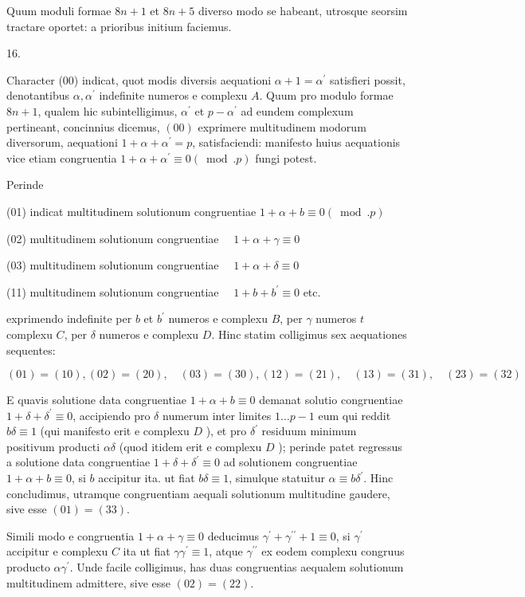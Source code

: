 \documentclass[10pt]{article}
\begin{document}
Quum moduli formae \(8 n+1\) et \(8 n+5\) diverso modo se habeant, utrosque seorsim tractare oportet: a prioribus initium faciemus.

16.

Character (00) indicat, quot modis diversis aequationi \(\alpha+1=\alpha^{\prime}\) satisfieri possit, denotantibus \(\alpha, \alpha^{\prime}\) indefinite numeros e complexu \(A\). Quum pro modulo formae \(8 n+1\), qualem hic subintelligimus, \(\alpha^{\prime}\) et \(p-\alpha^{\prime}\) ad eundem complexum pertineant, concinnius dicemus, \((00)\) exprimere multitudinem modorum diversorum, aequationi \(1+\alpha+\alpha^{\prime}=p\), satisfaciendi: manifesto huius aequationis vice etiam congruentia \(1+\alpha+\alpha^{\prime} \equiv 0(\bmod . p)\) fungi potest.

Perinde

(01) indicat multitudinem solutionum congruentiae \(1+\alpha+b \equiv 0(\bmod . p)\)

(02) multitudinem solutionum congruentiae \(\quad 1+\alpha+\gamma \equiv 0\)

(03) multitudinem solutionum congruentiae \(\quad 1+\alpha+\delta \equiv 0\)

(11) multitudinem solutionum congruentiae \(\quad 1+b+b^{\prime} \equiv 0\) etc.

exprimendo indefinite per \(b\) et \(b^{\prime}\) numeros e complexu \(B\), per \(\gamma\) numeros \(t\) complexu \(C\), per \(\delta\) numeros e complexu \(D\). Hinc statim colligimus sex aequationes sequentes:

\[
(01)=(10),(02)=(20), \quad(03)=(30),(12)=(21), \quad(13)=(31), \quad(23)=(32)
\]

E quavis solutione data congruentiae \(1+\alpha+b \equiv 0\) demanat solutio congruentiae \(1+\delta+\delta^{\prime} \equiv 0\), accipiendo pro \(\delta\) numerum inter limites \(1 \ldots p-1\)
eum qui reddit \(b \delta \equiv 1\) (qui manifesto erit e complexu \(D\) ), et pro \(\delta^{\prime}\) residuum minimum positivum producti \(\alpha \delta\) (quod itidem erit e complexu \(D\) ); perinde patet regressus a solutione data congruentiae \(1+\delta+\delta^{\prime} \equiv 0\) ad solutionem congruentiae \(1+\alpha+b \equiv 0\), si \(b\) accipitur ita. ut fiat \(b \delta \equiv 1\), simulque statuitur \(\alpha \equiv b \delta^{\prime}\). Hinc concludimus, utramque congruentiam aequali solutionum multitudine gaudere, sive esse \((01)=(33)\).

Simili modo e congruentia \(1+\alpha+\gamma \equiv 0\) deducimus \(\gamma^{\prime}+\gamma^{\prime \prime}+1 \equiv 0\), si \(\gamma^{\prime}\) accipitur e complexu \(C\) ita ut fiat \(\gamma \gamma^{\prime} \equiv 1\), atque \(\gamma^{\prime \prime}\) ex eodem complexu congruus producto \(\alpha \gamma^{\prime}\). Unde facile colligimus, has duas congruentias aequalem solutionum multitudinem admittere, sive esse \((02)=(22)\).
\end{document}
